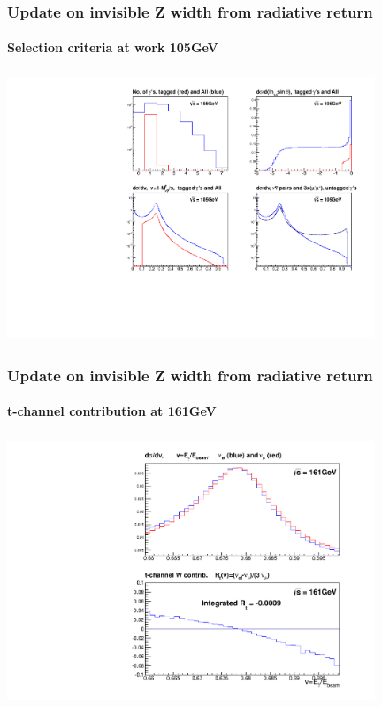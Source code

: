 \documentclass{beamer}
\begin{document}
\begin{frame}[fragile]
\frametitle{\bf Update on invisible Z width from radiative return}
\framesubtitle{\bf\large Selection criteria at work 105GeV}

\includegraphics[width=110mm,height=80mm]{./cFigInfo_E105.pdf}
\end{frame}


\begin{frame}[fragile]
\frametitle{\bf Update on invisible Z width from radiative return}
\framesubtitle{\bf\large t-channel contribution at 161GeV}

\includegraphics[width=110mm,height=80mm]{./cNuDiff_E161.pdf}
\end{frame}
\end{document}

